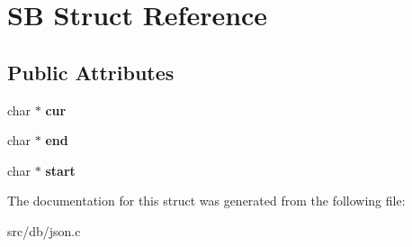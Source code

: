 \hypertarget{structSB}{
\section{SB Struct Reference}
\label{structSB}
}
\subsection*{Public Attributes}
\begin{DoxyCompactItemize}
\item 
\hypertarget{structSB_a9a314bb87b11a618d7fa123b38ebb329}{
char $\ast$ {\bfseries cur}}
\label{structSB_a9a314bb87b11a618d7fa123b38ebb329}

\item 
\hypertarget{structSB_a4d929c71e371fdf87df64c0c9173bf2a}{
char $\ast$ {\bfseries end}}
\label{structSB_a4d929c71e371fdf87df64c0c9173bf2a}

\item 
\hypertarget{structSB_a202bbe48a9fe924f98e873c37b25e5c3}{
char $\ast$ {\bfseries start}}
\label{structSB_a202bbe48a9fe924f98e873c37b25e5c3}

\end{DoxyCompactItemize}


The documentation for this struct was generated from the following file:\begin{DoxyCompactItemize}
\item 
src/db/json.c\end{DoxyCompactItemize}
